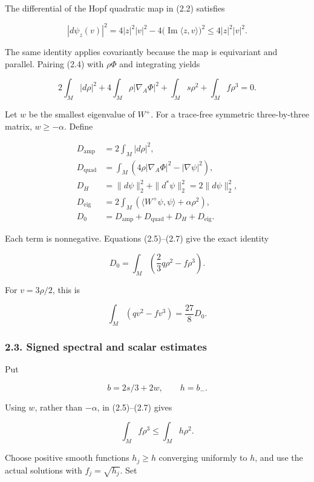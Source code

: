 \documentclass[
  10pt,
]{article}
\begin{document}
The differential of the Hopf quadratic map in (2.2) satisfies

\[
 |d\psi_z(v)|^2
       =4|z|^2|v|^2-4\bigl(\operatorname{Im}\langle z,v\rangle\bigr)^2
       \le4|z|^2|v|^2.                                   \tag{2.6}
\]

The same identity applies covariantly because the map is equivariant and
parallel. Pairing (2.4) with \(\rho\Phi\) and integrating yields

\[
 2\int_M|d\rho|^2+4\int_M\rho|\nabla_A\Phi|^2
                  +\int_Ms\rho^2+\int_M f\rho^3=0.       \tag{2.7}
\]

Let \(w\) be the smallest eigenvalue of \(W^+\). For a trace-free
symmetric three-by-three matrix, \(w\ge-\alpha\). Define

\[
 \begin{aligned}
 D_{\mathrm{amp}}&=2\int_M|d\rho|^2,\\
 D_{\mathrm{quad}}&=\int_M(4\rho|\nabla_A\Phi|^2-|\nabla\psi|^2),\\
 D_H&=\|d\psi\|_2^2+\|d^*\psi\|_2^2=2\|d\psi\|_2^2,\\
 D_{\mathrm{eig}}&=2\int_M
           (\langle W^+\psi,\psi\rangle+\alpha\rho^2),\\
 D_0&=D_{\mathrm{amp}}+D_{\mathrm{quad}}+D_H+D_{\mathrm{eig}}.
 \end{aligned}                                              \tag{2.8}
\]

Each term is nonnegative. Equations (2.5)--(2.7) give the exact identity

\[
 D_0=\int_M\left(\frac23q\rho^2-f\rho^3\right).
 \tag{2.9}
\]

For \(v=3\rho/2\), this is

\[
                  \int_M(qv^2-fv^3)=\frac{27}{8}D_0.
 \tag{2.10}
\]

\hypertarget{signed-spectral-and-scalar-estimates}{%
\subsubsection{2.3. Signed spectral and scalar
estimates}\label{signed-spectral-and-scalar-estimates}}

Put

\[
                  b=2s/3+2w,\qquad h=b_-.
\]

Using \(w\), rather than \(-\alpha\), in (2.5)--(2.7) gives

\[
                       \int_M f\rho^3\le\int_M h\rho^2.
 \tag{2.11}
\]

Choose positive smooth functions \(h_j\ge h\) converging uniformly to
\(h\), and use the actual solutions with \(f_j=\sqrt{h_j}\). Set
\end{document}

